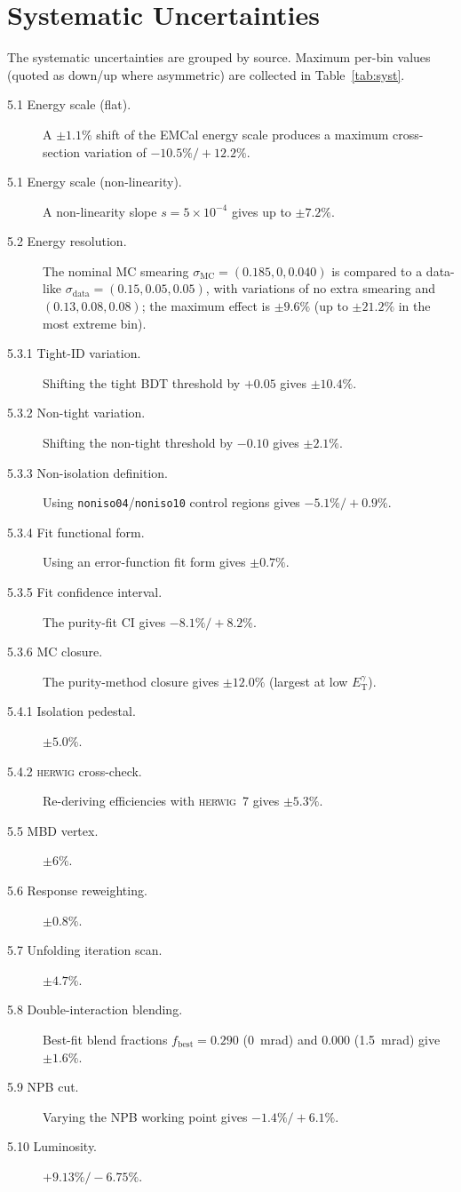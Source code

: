\documentclass[11pt]{article}
\newcommand{\ETg}{E_{\mathrm{T}}^{\gamma}}
\begin{document}
\section{Systematic Uncertainties}
\label{sec:syst}

The systematic uncertainties are grouped by source. Maximum per-bin values
(quoted as down/up where asymmetric) are collected in Table~\ref{tab:syst}.

\begin{description}
  \item[5.1 Energy scale (flat).] A $\pm1.1\%$ shift of the EMCal energy scale
        produces a maximum cross-section variation of $-10.5\%/+12.2\%$.
  \item[5.1 Energy scale (non-linearity).] A non-linearity slope $s=5\times10^{-4}$
        gives up to $\pm7.2\%$.
  \item[5.2 Energy resolution.] The nominal MC smearing
        $\sigma_{\mathrm{MC}}=(0.185,0,0.040)$ is compared to a data-like
        $\sigma_{\mathrm{data}}=(0.15,0.05,0.05)$, with variations of no extra
        smearing and $(0.13,0.08,0.08)$; the maximum effect is $\pm9.6\%$
        (up to $\pm21.2\%$ in the most extreme bin).
  \item[5.3.1 Tight-ID variation.] Shifting the tight BDT threshold by $+0.05$
        gives $\pm10.4\%$.
  \item[5.3.2 Non-tight variation.] Shifting the non-tight threshold by $-0.10$
        gives $\pm2.1\%$.
  \item[5.3.3 Non-isolation definition.] Using \texttt{noniso04}/\texttt{noniso10}
        control regions gives $-5.1\%/+0.9\%$.
  \item[5.3.4 Fit functional form.] Using an error-function fit form gives
        $\pm0.7\%$.
  \item[5.3.5 Fit confidence interval.] The purity-fit CI gives $-8.1\%/+8.2\%$.
  \item[5.3.6 MC closure.] The purity-method closure gives $\pm12.0\%$ (largest
        at low $\ETg$).
  \item[5.4.1 Isolation pedestal.] $\pm5.0\%$.
  \item[5.4.2 \textsc{herwig} cross-check.] Re-deriving efficiencies with
        \textsc{herwig}~7 gives $\pm5.3\%$.
  \item[5.5 MBD vertex.] $\pm6\%$.
  \item[5.6 Response reweighting.] $\pm0.8\%$.
  \item[5.7 Unfolding iteration scan.] $\pm4.7\%$.
  \item[5.8 Double-interaction blending.] Best-fit blend fractions
        $f_{\mathrm{best}}=0.290$ (0~mrad) and $0.000$ (1.5~mrad) give $\pm1.6\%$.
  \item[5.9 NPB cut.] Varying the NPB working point gives $-1.4\%/+6.1\%$.
  \item[5.10 Luminosity.] $+9.13\%/-6.75\%$.
\end{description}
\end{document}
